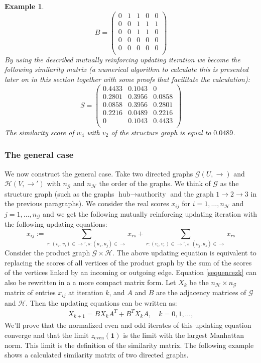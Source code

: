 \documentclass[a4paper,11pt]{report}
\newtheorem{example}[theorem]{Example}
\newcommand{\graf}{\mathscr{G}}
\newcommand{\grafeen}{\mathscr{H}}
\begin{document}
\begin{example}
$$B = \begin{pmatrix}
0 & 1 & 1 & 0 & 0\\
0 & 0 & 1 & 1 & 1\\
0 & 0 & 1 & 1 & 0\\
0 & 0 & 0 & 0 & 0\\
0 & 0 & 0 & 0 & 0\\
\end{pmatrix}$$
 By using the described mutually reinforcing updating iteration we become the 
 following similarity matrix (a numerical algorithm to calculate this is presented later 
 on in this section together with some proofs that facilitate the calculation):
 $$ S = \begin{pmatrix}
0.4433 & 0.1043 & 0 \\
0.2801 & 0.3956 & 0.0858 \\
0.0858 & 0.3956 & 0.2801\\
0.2216 & 0.0489 & 0.2216\\
0 & 0.1043 & 0.4433 \\
\end{pmatrix}$$
The similarity score of $w_4$ with $v_2$ of the structure graph is equal to 
$0.0489$.
 \end{example}

 \subsubsection{The general case}
 We now construct the general case. Take two directed graphs $\graf(U, \to)$ and $\grafeen(V, \to')$ 
 with $n_\graf$ and $n_\grafeen$ the order of the graphs. We think of $\graf$ as the structure 
 graph (such as the graphs $\text{hub}\to \text{authority}$ and the graph $1\to 2\to 
 3$ in the previous paragraphs). We consider the real scores $x_{ij}$ for $i = 1,\ldots,n_\grafeen$ and $j = 1,\ldots,n_\graf$ and we
 get the following mutually reinforcing updating iteration with the following updating equations:
 $$x_{ij} := \sum_{r:(v_r,v_i)\in \to', s:(u_s,u_j) \in \to} x_{rs} +  \sum_{r:(v_i,v_r)\in \to', s:(u_j,u_s) \in \to} x_{rs} $$
 Consider the product graph $\graf \times \grafeen.$ The above updating equation is equivalent to replacing
 the scores of all vertices of the product graph by the sum of the scores of the vertices linked by an incoming
 or outgoing edge. Equation \ref{sequencezk} can also be rewritten in a a more compact matrix form. Let $X_k$
 be the $n_\grafeen \times n_\graf$ matrix of entries $x_{ij}$ at iteration $k$, and $A$ and $B$ are the adjacency matrices
 of $\graf$ and $\grafeen$. Then the 
 updating equations can be written as:
 \begin{eqnarray}
X_{k+1} = BX_kA^T + B^TX_kA,\quad k=0,1,\ldots,
  \end{eqnarray}
We'll prove that the normalized even and odd iterates of 
 this updating equation converge and that the limit $z_{\text{even}}(\mathbf{1})$ 
 is the limit with the largest Manhattan norm. This limit is the definition of 
 the similarity matrix. The following example shows a calculated similarity 
 matrix of two directed graphs.
 
\end{document}
